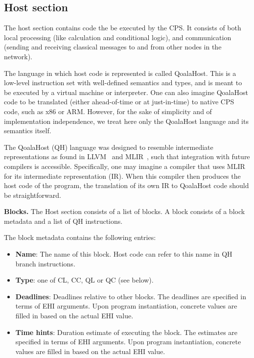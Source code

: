 \subsection{Host section}
The host section contains code the be executed by the CPS.
It consists of both local processing (like calculation and conditional logic), and
communication (sending and receiving classical messages to and from other nodes in the network).

The language in which host code is represented is called QoalaHost.
This is a low-level instruction set with well-defined semantics and types,
and is meant to be executed by a virtual machine or interpreter.
One can also imagine QoalaHost code to be translated (either ahead-of-time or at just-in-time) to native CPS code, such as x86 or ARM. However, for the sake of simplicity and of implementation independence, we treat here only the QoalaHost language and its semantics itself.

The QoalaHost (QH) language was designed to resemble intermediate representations as found in LLVM~\cite{lattner2004llvm} and MLIR~\cite{lattner2021mlir},
such that integration with future compilers is accessible.
Specifically, one may imagine a compiler that uses MLIR for its intermediate representation (IR).
When this compiler then produces the host code of the program, the translation of its own IR to QoalaHost code should be straightforward.

\textbf{Blocks.} 
The Host section consists of a list of blocks.
A block consists of a block metadata and a list of QH instructions.

The block metadata contains the following entries:
\begin{itemize}
\item \textbf{Name}: The name of this block. Host code can refer to this name in QH branch instructions.
\item \textbf{Type}: one of CL, CC, QL or QC (see below).
\item \textbf{Deadlines}: Deadlines relative to other blocks.
The deadlines are specified in terms of EHI arguments. Upon program instantiation, concrete values are filled in based on the actual EHI value.
\item \textbf{Time hints}: Duration estimate of executing the block.
The estimates are specified in terms of EHI arguments. Upon program instantiation, concrete values are filled in based on the actual EHI value.
\end{itemize}


